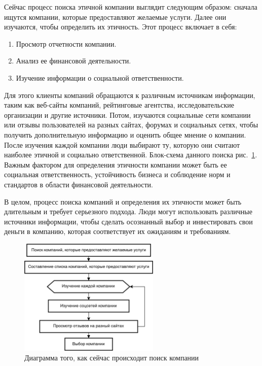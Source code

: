 \documentclass[PI, VKR]{HSEUniversity}
\begin{document}
Сейчас процесс поиска этичной компании выглядит следующим образом: сначала ищутся компании, которые предоставляют желаемые услуги. Далее они изучаются, чтобы определить их этичность. Этот процесс включает в себя:
\begin{enumerate}
\item Просмотр отчетности компании.
\item Анализ ее финансовой деятельности.
\item Изучение информации о социальной ответственности.
\end{enumerate}

Для этого клиенты компаний обращаются к различным источникам информации, таким как веб-сайты компаний, рейтинговые агентства, исследовательские организации и другие источники. Потом, изучаются социальные сети компании или отзывы пользователей на разных сайтах, форумах и социальных сетях, чтобы получить дополнительную информацию и оценить общее мнение о компании. После изучения каждой компании люди выбирают ту, которую они считают наиболее этичной и социально ответственной. Блок-схема данного поиска рис.~\ref{fig:as_is}. Важным фактором для определения этичности компании может быть ее социальная ответственность, устойчивость бизнеса и соблюдение норм и стандартов в области финансовой деятельности.

В целом, процесс поиска компаний и определения их этичности может быть длительным и требует серьезного подхода. Люди могут использовать различные источники информации, чтобы сделать осознанный выбор и инвестировать свои деньги в компанию, которая соответствует их ожиданиям и требованиям.
\begin{figure}[h]
\centering
\includegraphics[width=0.6\textwidth]{img/mermaid/as_is_drawio.png}
\caption{\label{fig:as_is}Диаграмма того, как сейчас происходит поиск компании}
\end{figure}
\end{document}
